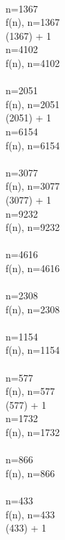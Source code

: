 \documentclass{article}
\begin{document}
 \\ 
 \Rightarrow n=1367
 \\[3mm] 
f(n), n=1367
 \\ 
 (1367) + 1
 \\ 
 \Rightarrow n=4102
 \\[3mm] 
f(n), n=4102
 \\ 
 \Rightarrow {} 
 \\ 
 \Rightarrow n=2051
 \\[3mm] 
f(n), n=2051
 \\ 
 (2051) + 1
 \\ 
 \Rightarrow n=6154
 \\[3mm] 
f(n), n=6154
 \\ 
 \Rightarrow {} 
 \\ 
 \Rightarrow n=3077
 \\[3mm] 
f(n), n=3077
 \\ 
 (3077) + 1
 \\ 
 \Rightarrow n=9232
 \\[3mm] 
f(n), n=9232
 \\ 
 \Rightarrow {} 
 \\ 
 \Rightarrow n=4616
 \\[3mm] 
f(n), n=4616
 \\ 
 \Rightarrow {} 
 \\ 
 \Rightarrow n=2308
 \\[3mm] 
f(n), n=2308
 \\ 
 \Rightarrow {} 
 \\ 
 \Rightarrow n=1154
 \\[3mm] 
f(n), n=1154
 \\ 
 \Rightarrow {} 
 \\ 
 \Rightarrow n=577
 \\[3mm] 
f(n), n=577
 \\ 
 (577) + 1
 \\ 
 \Rightarrow n=1732
 \\[3mm] 
f(n), n=1732
 \\ 
 \Rightarrow {} 
 \\ 
 \Rightarrow n=866
 \\[3mm] 
f(n), n=866
 \\ 
 \Rightarrow {} 
 \\ 
 \Rightarrow n=433
 \\[3mm] 
f(n), n=433
 \\ 
 (433) + 1
 \\ 
\end{document}

